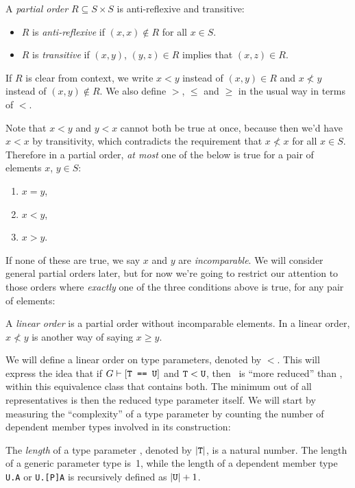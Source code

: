 \documentclass[../generics]{subfiles}
\begin{document}
\begin{definition}\label{def order}
A \emph{partial order} $R\subseteq S\times S$ is anti-reflexive and transitive:
\begin{itemize}
\item $R$ is \emph{anti-reflexive} if $(x,x)\notin R$ for all $x\in S$.
\item $R$ is \emph{transitive} if $(x,y)$, $(y,z)\in R$ implies that $(x,z)\in R$.
\end{itemize}
If $R$ is clear from context, we write $x<y$ instead of $(x,y)\in R$ and $x\not< y$ instead of $(x,y)\notin R$. We also define $>$, $\leq$ and $\geq$ in the usual way in terms of $<$.
\end{definition}
Note that $x<y$ and $y<x$ cannot both be true at once, because then we'd have $x<x$ by transitivity, which contradicts the requirement that $x\not< x$ for all $x\in S$. Therefore in a partial order, \emph{at most} one of the below is true for a pair of elements $x$, $y\in S$:
\begin{enumerate}
\item $x=y$,
\item $x<y$,
\item $x>y$.
\end{enumerate}
If none of these are true, we say $x$ and $y$ are \emph{incomparable}. We will consider general partial orders later, but for now we're going to restrict our attention to those orders where \emph{exactly} one of the three conditions above is true, for any pair of elements:
\begin{definition}
A \emph{linear order} is a partial order without incomparable elements. In a linear order, $x\not< y$ is another way of saying $x \geq y$.
\end{definition}

We will define a linear order on type parameters, denoted by $<$. This will express the idea that if $G\vdash[\texttt{T == U}]$ and $\texttt{T}<\texttt{U}$, then \tT\ is ``more reduced'' than \tU, within this equivalence class that contains both. The minimum out of all representatives is then the reduced type parameter itself. We will start by measuring the ``complexity'' of a type parameter by counting the number of dependent member types involved in its construction:
\begin{definition}
The \emph{length} of a type parameter \tT, denoted by $|\texttt{T}|$, is a natural number. The length of a generic parameter type is~1, while the length of a dependent member type \texttt{U.A} or \texttt{U.[P]A} is recursively defined as $|\texttt{U}|+1$.
\end{definition}
\end{document}
